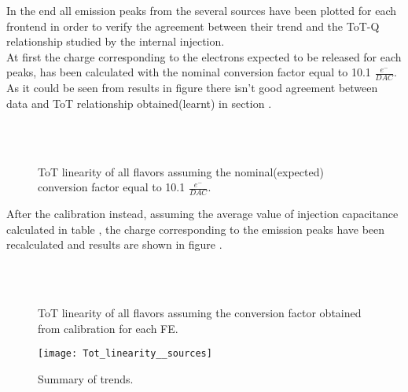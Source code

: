 In the end all emission peaks from the several sources have been plotted for each frontend in order to verify the agreement between their trend and the ToT-Q relationship studied by the internal injection. \\

At first the charge corresponding to the electrons expected to be released for each peaks, has been calculated with the nominal conversion factor equal to 10.1 $\frac{e^{-}}{DAC}$. As it could be seen from results in figure  there isn't good agreement between data and ToT relationship obtained(learnt) in section .


\begin{figure}
\centering
{}\quad
{}\\
\quad
{}\\
\caption{ToT linearity of all flavors assuming the nominal(expected) conversion factor equal to 10.1 $\frac{e^{-}}{DAC}$.}
\label{fig:inj_cap_10}
\end{figure} 

After the calibration instead, assuming the average value of injection capacitance calculated in table , the charge corresponding to the emission peaks have been recalculated and results are shown in figure .

\begin{figure}[h!]
\centering
{}\quad
{}\\
\quad
{}\\
\caption{ToT linearity of all flavors assuming the conversion factor obtained from calibration for each FE.}
\label{fig:inj_cap_sources}
\end{figure} 

\begin{figure}[h!]
\centering
\texttt{[image: Tot\_linearity\_\_sources]}
\caption{Summary of trends.}
\label{inj_cap_sum}
\end{figure}

